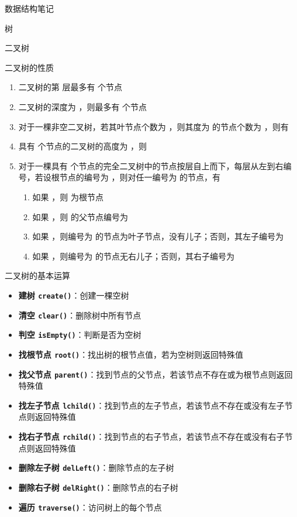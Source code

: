 \documentclass[
  ignorenonframetext,
]{beamer}
\providecommand{\tightlist}{%
  \setlength{\itemsep}{0pt}\setlength{\parskip}{0pt}}
\begin{document}
\begin{frame}[fragile]{数据结构笔记}
\begin{block}{树}
\begin{block}{二叉树}
\begin{block}{二叉树的性质}
\protect{}\label{ux4e8cux53c9ux6811ux7684ux6027ux8d28}
\begin{enumerate}
\tightlist
\item
  二叉树的第 {} 层最多有 {} 个节点
\item
  二叉树的深度为 {}，则最多有 {} 个节点
\item
  对于一棵非空二叉树，若其叶节点个数为 {}，则其度为 {} 的节点个数为
  {}，则有 {}
\item
  具有 {} 个节点的二叉树的高度为 {}，则 {}
\item
  对于一棵具有 {}
  个节点的完全二叉树中的节点按层自上而下，每层从左到右编号，若设根节点的编号为
  {}，则对任一编号为 {} 的节点，有

  \begin{enumerate}
  \tightlist
  \item
    如果 {}，则 {} 为根节点
  \item
    如果 {}，则 {} 的父节点编号为 {}
  \item
    如果 {}，则编号为 {} 的节点为叶子节点，没有儿子；否则，其左子编号为
    {}
  \item
    如果 {}，则编号为 {} 的节点无右儿子；否则，其右子编号为 {}
  \end{enumerate}
\end{enumerate}
\end{block}

\begin{block}{二叉树的基本运算}
\protect{}\label{ux4e8cux53c9ux6811ux7684ux57faux672cux8fd0ux7b97}
\begin{itemize}
\tightlist
\item
  \textbf{建树 \texttt{create()}}：创建一棵空树
\item
  \textbf{清空 \texttt{clear()}}：删除树中所有节点
\item
  \textbf{判空 \texttt{isEmpty()}}：判断是否为空树
\item
  \textbf{找根节点
  \texttt{root()}}：找出树的根节点值，若为空树则返回特殊值
\item
  \textbf{找父节点
  \texttt{parent()}}：找到节点的父节点，若该节点不存在或为根节点则返回特殊值
\item
  \textbf{找左子节点
  \texttt{lchild()}}：找到节点的左子节点，若该节点不存在或没有左子节点则返回特殊值
\item
  \textbf{找右子节点
  \texttt{rchild()}}：找到节点的右子节点，若该节点不存在或没有右子节点则返回特殊值
\item
  \textbf{删除左子树 \texttt{delLeft()}}：删除节点的左子树
\item
  \textbf{删除右子树 \texttt{delRight()}}：删除节点的右子树
\item
  \textbf{遍历 \texttt{traverse()}}：访问树上的每个节点
\end{itemize}
\end{block}


\end{block}
\end{block}
\end{frame}
\end{document}
